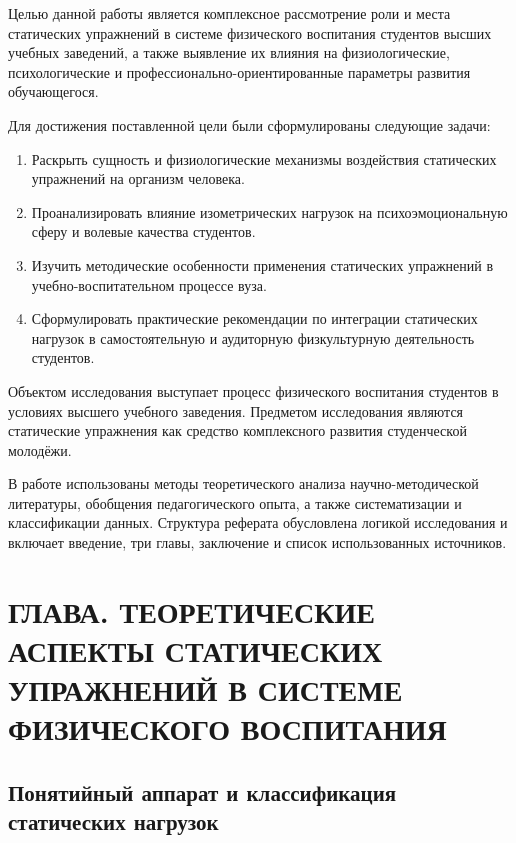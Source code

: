 \documentclass[oneside,a4paper,14pt]{extarticle}
\begin{document}
Целью данной работы является комплексное рассмотрение роли и места статических упражнений в системе физического воспитания студентов высших учебных заведений, а также выявление их влияния на физиологические, психологические и профессионально-ориентированные параметры развития обучающегося.

Для достижения поставленной цели были сформулированы следующие задачи:
\begin{enumerate}
    \item Раскрыть сущность и физиологические механизмы воздействия статических упражнений на организм человека.
    \item Проанализировать влияние изометрических нагрузок на психоэмоциональную сферу и волевые качества студентов.
    \item Изучить методические особенности применения статических упражнений в учебно-воспитательном процессе вуза.
    \item Сформулировать практические рекомендации по интеграции статических нагрузок в самостоятельную и аудиторную физкультурную деятельность студентов.
\end{enumerate}

Объектом исследования выступает процесс физического воспитания студентов в условиях высшего учебного заведения. Предметом исследования являются статические упражнения как средство комплексного развития студенческой молодёжи.

В работе использованы методы теоретического анализа научно-методической литературы, обобщения педагогического опыта, а также систематизации и классификации данных. Структура реферата обусловлена логикой исследования и включает введение, три главы, заключение и список использованных источников.

\section{ГЛАВА. ТЕОРЕТИЧЕСКИЕ АСПЕКТЫ СТАТИЧЕСКИХ УПРАЖНЕНИЙ В СИСТЕМЕ ФИЗИЧЕСКОГО ВОСПИТАНИЯ}

\subsection{Понятийный аппарат и классификация статических нагрузок}
\end{document}
